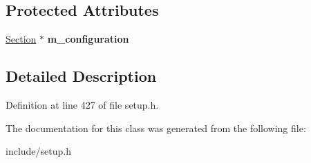\subsection*{Protected Attributes}
\begin{DoxyCompactItemize}
\item 
\hypertarget{classModule__base_aceab15faaa79b216f6d417b0c80fdce6}{\hyperlink{classSection}{Section} $\ast$ {\bfseries m\-\_\-configuration}}\label{classModule__base_aceab15faaa79b216f6d417b0c80fdce6}

\end{DoxyCompactItemize}


\subsection{Detailed Description}


Definition at line 427 of file setup.\-h.



The documentation for this class was generated from the following file\-:\begin{DoxyCompactItemize}
\item 
include/setup.\-h\end{DoxyCompactItemize}
